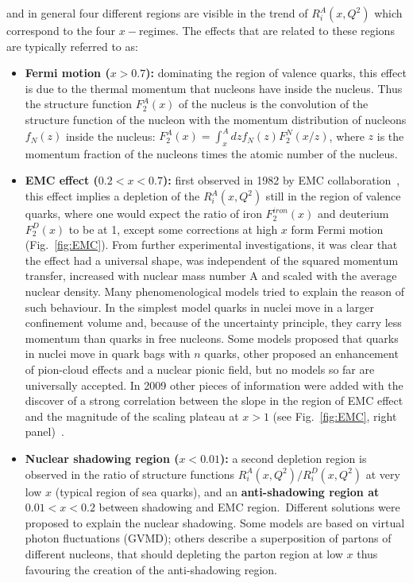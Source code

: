 and in general four different regions are visible in the trend of $R_i^A(x,Q^2)$ 
which correspond to the four $x-$regimes. The effects that are related to these regions are typically referred to as:
\begin{itemize}
\item {\bf Fermi motion ($x > 0.7$):} dominating the region of valence quarks, this effect is due to the 
thermal momentum that nucleons have inside the nucleus. Thus the structure function $F^A_2(x)$ of the nucleus
is the convolution of the structure function of the nucleon with the momentum distribution
of nucleons $f_N(z)$ inside the nucleus: $F^A_2(x) = \int_x^A dz f_N(z) F_2^N(x/z)$, where $z$ is the momentum fraction
of the nucleons times the atomic number of the nucleus.
\item {\bf EMC effect ($0.2 < x < 0.7$):} first observed in 1982 by EMC collaboration~\cite{Aubert:1983xm},
this effect implies a depletion of the  $R_i^A(x,Q^2)$ still in the region of valence quarks, where one would expect 
the ratio of iron $F^{iron}_2(x)$ and deuterium $F^D_2(x)$ to be at 1, except some corrections at high $x$ form Fermi motion (Fig.~\ref{fig:EMC}). From further
experimental investigations, it was clear that the effect had a universal shape, was independent of the 
squared momentum transfer, increased with nuclear mass number A and scaled with the average nuclear density. 
Many phenomenological models tried to explain the reason of such behaviour. In the simplest model 
quarks in nuclei move in a larger confinement volume and, because of the uncertainty principle, 
they carry less momentum than quarks in free nucleons. Some models proposed that 
quarks in nuclei move in quark bags with $n$ quarks, other proposed an enhancement 
of pion-cloud effects and a nuclear pionic field, but no models so far are universally accepted. 
 In 2009 other pieces of information were added with the
discover of a strong correlation between the slope in the region of EMC effect and the magnitude of the scaling plateau 
at $x > 1$ (see Fig.~\ref{fig:EMC}, right panel)~\cite{Seely:2009gt}.
\item {\bf Nuclear shadowing region ($x < 0.01$):} a second depletion region
is observed in the ratio of structure functions $R_i^A(x,Q^2)/R_i^D(x,Q^2)$ at very low $x$ (typical region of sea quarks), and
an {\bf anti-shadowing region at $0.01 < x < 0.2$} between shadowing and EMC region.~Different solutions were
proposed to explain the nuclear shadowing. Some models are based on virtual photon fluctuations (GVMD); others
describe a superposition of partons of different nucleons, that should depleting the parton region at low $x$ thus favouring
the creation of the anti-shadowing region.

\end{itemize}


